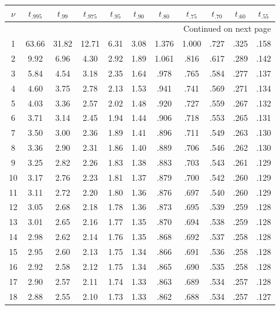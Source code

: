 \documentclass[12pt,a4paper]{article}
\begin{document}
\begin{enumerate}
\begin{center}
\begin{longtable}{c | ccccc | ccccc}
\toprule
$\nu$ & $t_{.995}$ & $t_{.99}$ & $t_{.975}$ & $t_{.95}$ & $t_{.90}$ & $t_{.80}$ & $t_{.75}$ & $t_{.70}$ & $t_{.60}$ & $t_{.55}$ \\
\midrule
\endhead

\midrule
\multicolumn{11}{r}{{Continued on next page}} \\
\bottomrule
\endfoot

\bottomrule
\endlastfoot

1 & 63.66 & 31.82 & 12.71 & 6.31 & 3.08 & 1.376 & 1.000 & .727 & .325 & .158 \\
2 & 9.92 & 6.96 & 4.30 & 2.92 & 1.89 & 1.061 & .816 & .617 & .289 & .142 \\
3 & 5.84 & 4.54 & 3.18 & 2.35 & 1.64 & .978 & .765 & .584 & .277 & .137 \\
4 & 4.60 & 3.75 & 2.78 & 2.13 & 1.53 & .941 & .741 & .569 & .271 & .134 \\
5 & 4.03 & 3.36 & 2.57 & 2.02 & 1.48 & .920 & .727 & .559 & .267 & .132 \\
6 & 3.71 & 3.14 & 2.45 & 1.94 & 1.44 & .906 & .718 & .553 & .265 & .131 \\
7 & 3.50 & 3.00 & 2.36 & 1.89 & 1.41 & .896 & .711 & .549 & .263 & .130 \\
8 & 3.36 & 2.90 & 2.31 & 1.86 & 1.40 & .889 & .706 & .546 & .262 & .130 \\
9 & 3.25 & 2.82 & 2.26 & 1.83 & 1.38 & .883 & .703 & .543 & .261 & .129 \\
10 & 3.17 & 2.76 & 2.23 & 1.81 & 1.37 & .879 & .700 & .542 & .260 & .129 \\
11 & 3.11 & 2.72 & 2.20 & 1.80 & 1.36 & .876 & .697 & .540 & .260 & .129 \\
12 & 3.05 & 2.68 & 2.18 & 1.78 & 1.36 & .873 & .695 & .539 & .259 & .128 \\
13 & 3.01 & 2.65 & 2.16 & 1.77 & 1.35 & .870 & .694 & .538 & .259 & .128 \\
14 & 2.98 & 2.62 & 2.14 & 1.76 & 1.35 & .868 & .692 & .537 & .258 & .128 \\
15 & 2.95 & 2.60 & 2.13 & 1.75 & 1.34 & .866 & .691 & .536 & .258 & .128 \\
16 & 2.92 & 2.58 & 2.12 & 1.75 & 1.34 & .865 & .690 & .535 & .258 & .128 \\
17 & 2.90 & 2.57 & 2.11 & 1.74 & 1.33 & .863 & .689 & .534 & .257 & .128 \\
18 & 2.88 & 2.55 & 2.10 & 1.73 & 1.33 & .862 & .688 & .534 & .257 & .127 \\

\end{longtable}
\end{center}
\end{enumerate}
\end{document}
